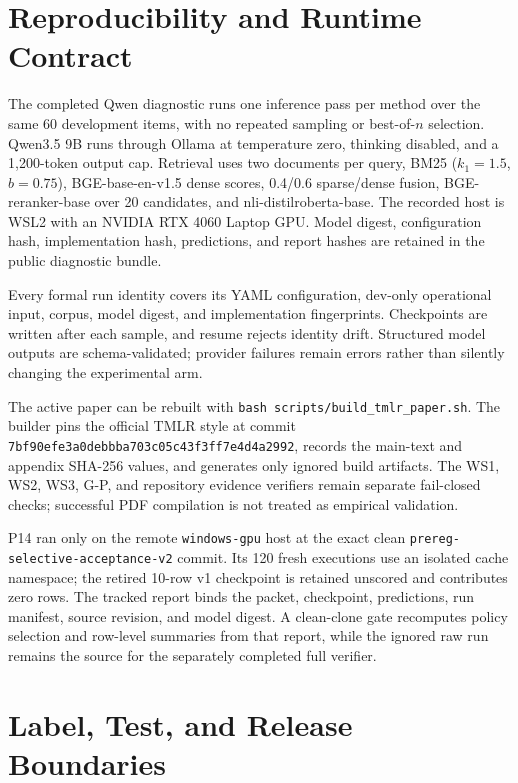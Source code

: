 \section{Reproducibility and Runtime Contract}
\label{app:reproducibility}

The completed Qwen diagnostic runs one inference pass per method over the same
60 development items, with no repeated sampling or best-of-$n$ selection.
Qwen3.5 9B runs through Ollama at temperature zero, thinking disabled, and a
1,200-token output cap. Retrieval uses two documents per query, BM25
($k_1=1.5$, $b=0.75$), BGE-base-en-v1.5 dense scores, 0.4/0.6 sparse/dense
fusion, BGE-reranker-base over 20 candidates, and nli-distilroberta-base. The
recorded host is WSL2 with an NVIDIA RTX 4060 Laptop GPU. Model digest,
configuration hash, implementation hash, predictions, and report hashes are
retained in the public diagnostic bundle.

Every formal run identity covers its YAML configuration, dev-only operational
input, corpus, model digest, and implementation fingerprints. Checkpoints are
written after each sample, and resume rejects identity drift. Structured model
outputs are schema-validated; provider failures remain errors rather than
silently changing the experimental arm.

The active paper can be rebuilt with
\texttt{bash scripts/build\_tmlr\_paper.sh}. The builder pins the official TMLR
style at commit
\texttt{7bf90efe3a0debbba703c05c43f3ff7e4d4a2992}, records the main-text and
appendix SHA-256 values, and generates only ignored build artifacts. The WS1,
WS2, WS3, G-P, and repository evidence verifiers remain separate fail-closed
checks; successful PDF compilation is not treated as empirical validation.

P14 ran only on the remote \texttt{windows-gpu} host at the exact clean
\texttt{prereg-selective-acceptance-v2} commit. Its 120 fresh executions use an
isolated cache namespace; the retired 10-row v1 checkpoint is retained unscored
and contributes zero rows. The tracked report binds the packet, checkpoint,
predictions, run manifest, source revision, and model digest. A clean-clone gate
recomputes policy selection and row-level summaries from that report, while the
ignored raw run remains the source for the separately completed full verifier.

\section{Label, Test, and Release Boundaries}
\label{app:boundaries}

